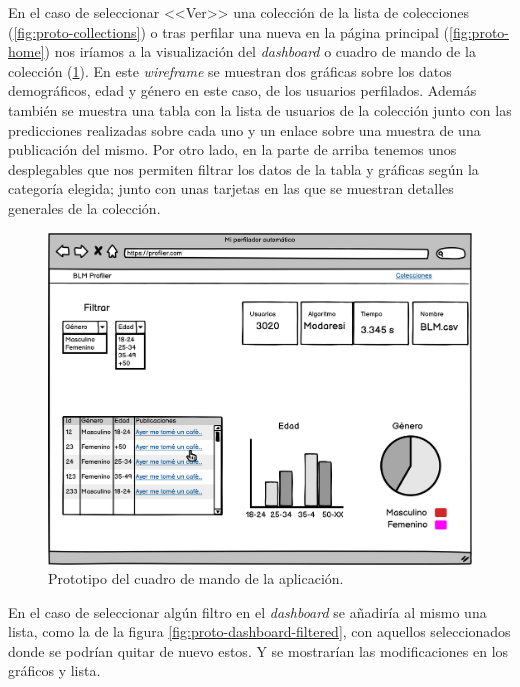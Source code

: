 En el caso de seleccionar <<Ver>> una colección de la lista de colecciones (\ref{fig:proto-collections}) o tras perfilar una nueva en la página principal (\ref{fig:proto-home}) nos iríamos a la visualización del \textit{dashboard} o cuadro de mando de la colección (\ref{fig:proto-dashboard}). En este \textit{wireframe} se muestran dos gráficas sobre los datos demográficos, edad y género en este caso, de los usuarios perfilados. Además también se muestra una tabla con la lista de usuarios de la colección junto con las predicciones realizadas sobre cada uno y un enlace sobre una muestra de una publicación del mismo. Por otro lado, en la parte de arriba tenemos unos desplegables que nos permiten filtrar los datos de la tabla y gráficas según la categoría elegida; junto con unas tarjetas en las que se muestran detalles generales de la colección.

\begin{figure}[H]
  \centering
  \includegraphics[width=\textwidth]{imaxes/prototipo/dashboard-unfiltered.png}
  \caption{Prototipo del cuadro de mando de la aplicación.}
  \label{fig:proto-dashboard}
\end{figure}

En el caso de seleccionar algún filtro en el \textit{dashboard} se añadiría al mismo una lista, como la de la figura \ref{fig:proto-dashboard-filtered}, con aquellos seleccionados donde se podrían quitar de nuevo estos. Y se mostrarían las modificaciones en los gráficos y lista.

